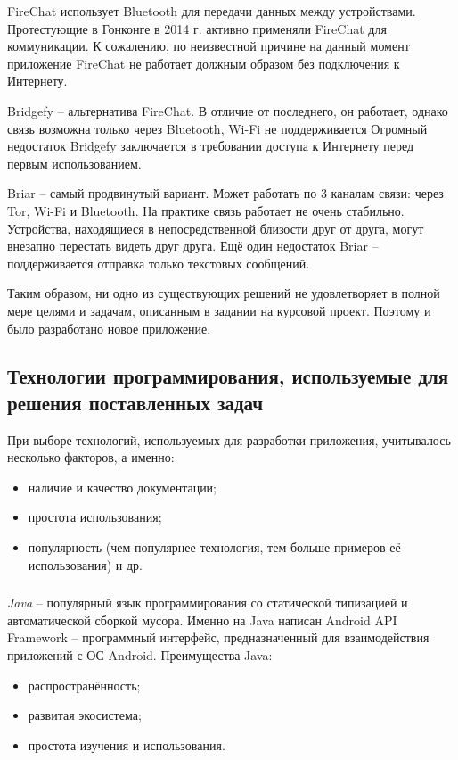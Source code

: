 FireChat использует Bluetooth для передачи данных между устройствами.
Протестующие в Гонконге в 2014 г. активно применяли FireChat для коммуникации.
К сожалению, по неизвестной причине на данный момент приложение FireChat не работает должным образом без подключения к Интернету.

Bridgefy -- альтернатива FireChat.
В отличие от последнего, он работает, однако связь возможна только через Bluetooth, Wi-Fi не поддерживается
Огромный недостаток Bridgefy заключается в требовании доступа к Интернету перед первым использованием.

Briar -- самый продвинутый вариант. Может работать по 3 каналам связи: через Tor, Wi-Fi и Bluetooth.
На практике связь работает не очень стабильно.
Устройства, находящиеся в непосредственной близости друг от друга, могут внезапно перестать видеть друг друга.
Ещё один недостаток Briar -- поддерживается отправка только текстовых сообщений.

Таким образом, ни одно из существующих решений не удовлетворяет в полной мере целями и задачам, описанным в задании на курсовой проект.
Поэтому и было разработано новое приложение.

\subsection{Технологии программирования, используемые для решения поставленных задач}
\label{sub:theory_and_motivation:tools}

При выборе технологий, используемых для разработки приложения, учитывалось несколько факторов, а именно:
\begin{itemize}
	\item наличие и качество документации;
	\item простота использования;
	\item популярность (чем популярнее технология, тем больше примеров её использования) и др.
\end{itemize}

\subsubsection{}
\label{subsub:theory_and_motivation:tools:java}

\textit{Java} -- популярный язык программирования со статической типизацией и автоматической сборкой мусора.
Именно на Java написан Android API Framework -- программный интерфейс, предназначенный для взаимодействия приложений с ОС Android.
Преимущества Java:
\begin{itemize}
	\item распространённость;
	\item развитая экосистема;
	\item простота изучения и использования.
\end{itemize}


